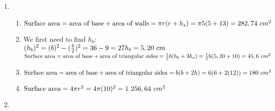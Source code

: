  \begin{solutions}{}{
\begin{enumerate}[itemsep=5pt, label=\textbf{\arabic*}. ] 
\item \begin{enumerate}[itemsep=5pt, label=\textbf{(\alph*)}]
       \item $\mbox{Surface area} = \mbox{area of base} + \mbox{area of walls}\\
= \pi r(r + h_s)\\
=\pi 5(5 + 13) \\
= 282,74 ~cm^{2}$
  \item We first need to find $h_b$:\\
$(h_b)^2 = (b)^2 - (\frac{b}{2})^2 \\
= 36 - 9 \\
= 27 \\
h_b = 5,20 ~cm$\\
$\mbox{Surface area} = \mbox{area of base} + \mbox{area of triangular sides}\\
=\frac{1}{2}b(h_{b} + 3h_{s})\\
=\frac{1}{2}6(5,20 + 10)\\
= 45,6 ~cm^{2}$
  \item 
$\mbox{Surface area} = \mbox{area of base} + \mbox{area of triangular sides}\\
= b(b + 2h)\\
= 6(6 + 2(12)) \\
= 180~cm^2$
  \item $\mbox{Surface area} = 4 \pi r^2 \\
= 4 \pi (10)^2 \\
= 1~256,64 ~cm^2$
      \end{enumerate}
\item {}
\end{enumerate}}
\end{solutions}
